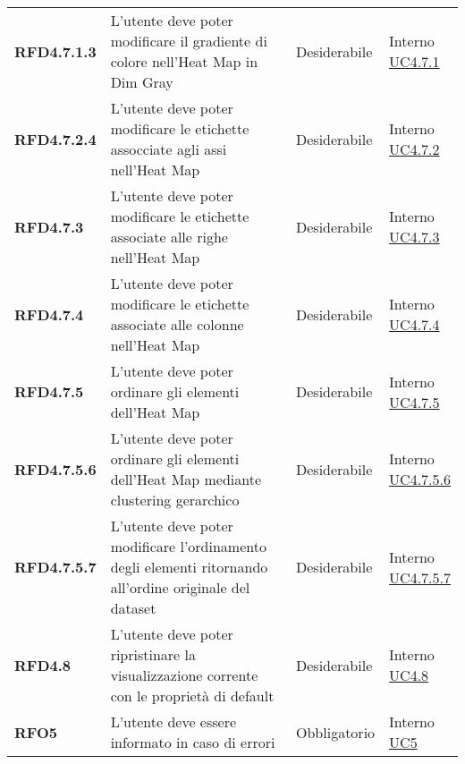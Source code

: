 \begin{longtable}[H]{>{\raggedright\bfseries}m{20mm} >{\raggedright}m{90mm} >{\raggedright}m{28mm} >{\raggedright\arraybackslash}m{30mm}}
    RFD4.7.1.3
    & L'utente deve poter modificare il gradiente di colore nell'Heat Map in Dim Gray
    & Desiderabile
    & \makecell{ Interno \\  \hyperref[par:uc4.7.1]{UC4.7.1} }\\

    RFD4.7.2.4
    & L'utente deve poter modificare le etichette assocciate agli assi nell'Heat Map
    & Desiderabile
    & \makecell{ Interno \\  \hyperref[par:uc4.7.2]{UC4.7.2} }\\

    RFD4.7.3
    & L'utente deve poter modificare le etichette associate alle righe nell'Heat Map
    & Desiderabile
    & \makecell{ Interno \\  \hyperref[par:uc4.7.3]{UC4.7.3} }\\

    RFD4.7.4
    & L'utente deve poter modificare le etichette associate alle colonne nell'Heat Map
    & Desiderabile
    & \makecell{ Interno \\  \hyperref[par:uc4.7.4]{UC4.7.4} }\\

    RFD4.7.5
    & L'utente deve poter ordinare gli elementi dell'Heat Map
    & Desiderabile
    & \makecell{ Interno \\  \hyperref[par:uc4.7.5]{UC4.7.5} }\\

    RFD4.7.5.6
    & L'utente deve poter ordinare gli elementi dell'Heat Map mediante clustering gerarchico
    & Desiderabile
    & \makecell{ Interno \\  \hyperref[spar:uc4.7.5.6]{UC4.7.5.6} }\\

    RFD4.7.5.7
    & L'utente deve poter modificare l'ordinamento degli elementi ritornando all'ordine originale del dataset
    & Desiderabile
    & \makecell{ Interno \\  \hyperref[spar:uc4.7.5.7]{UC4.7.5.7} }\\

    RFD4.8
    & L'utente deve poter ripristinare la visualizzazione corrente con le proprietà di default
    & Desiderabile
    & \makecell{ Interno \\  \hyperref[ssub:uc4.8]{UC4.8} }\\

    RFO5
    & L'utente deve essere informato in caso di errori
    & Obbligatorio
    & \makecell{ Interno \\  \hyperref[sub:uc5]{UC5} }\\


\end{longtable}
